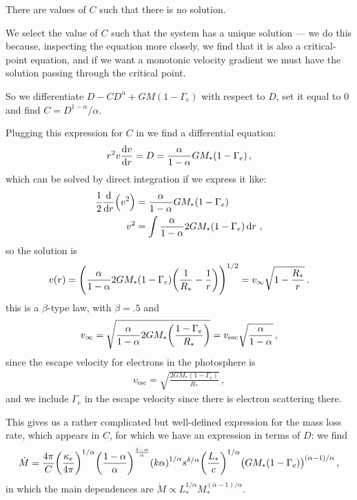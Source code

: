 \documentclass[main.tex]{subfiles}
\begin{document}
There are values of \(C\) such that there is no solution. 

We select the value of \(C\) such that the system has a unique solution --- we do this because, inspecting the equation more closely, we find that it is also a critical-point equation, and if we want a monotonic velocity gradient we must have the solution passing through the critical point.


So we differentiate \(D - C D^{\alpha } + GM (1-\Gamma_{e})\) with respect to \(D\), set it equal to \(0\) and find \(C = D^{1-\alpha } / \alpha \).

Plugging this expression for \(C\) in we find a differential equation: 
%
\begin{align}
  r^2 v \dv{v}{r} = D = \frac{\alpha }{1 - \alpha } GM_{*} (1-\Gamma_{e})
\,,
\end{align}
%
which can be solved by direct integration if we express it like: 
%
\begin{align}
\frac{1}{2} \dv{}{r} \qty(v^2)
&= \frac{\alpha }{1-\alpha } GM_{*} (1 - \Gamma_{e}) \\
v^2 &= \int  \frac{\alpha }{1-\alpha } 2GM_{*} (1 - \Gamma_{e}) \dd{r} 
\,,
\end{align}
%
so the solution is 
%
\begin{align}
  v(r) = \qty(\frac{\alpha }{1-\alpha } 2GM_{*} \qty(1-\Gamma_{e} ) \qty(\frac{1}{R_{*}} - \frac{1}{r}))^{1/2}
  = v_{ \infty } \sqrt{1 - \frac{R_{*}}{r}}
\,. 
\end{align}
%
this is a \(\beta \)-type law, with \(\beta = \num{.5}\) and 
%
\begin{align}
  v_{ \infty } = \sqrt{\frac{\alpha }{1-\alpha } 2GM_{*} \qty(\frac{1-\Gamma_{e} }{R_{*}})}
  = v _{\text{esc}} \sqrt{\frac{\alpha }{1 - \alpha }}
\,,
\end{align}
%
since the escape velocity for electrons in the photosphere is 
%
\begin{align}
  v _{\text{esc}} = \sqrt{\frac{2 G M_{*} (1 - \Gamma_{e })}{R_{*}}}
\,,
\end{align}
%
and we include \(\Gamma_{e} \) in the escape velocity since there is electron scattering there.

This gives us a rather complicated but well-defined expression for the mass loss rate, which appears in \(C\), for which we have an expression in terms of \(D\): we find
%
\begin{align}
\dot{M} = \frac{4 \pi }{C} \qty(\frac{\kappa_{e}}{4 \pi})^{1/\alpha } \qty(\frac{1-\alpha }{\alpha })^{\frac{1-\alpha }{\alpha }} \qty(k \alpha )^{1/\alpha }
s^{ \delta / \alpha } \qty(\frac{L_{*}}{c})^{1/\alpha }
\qty(GM_{*} (1-\Gamma_{e}))^{(\alpha -1) / \alpha }
\,,
\end{align}
in which the main dependences are \(\dot{M} \propto L_{*}^{ 1/ \alpha } M_{*}^{(\alpha - 1 ) / \alpha }\).
\end{document}
